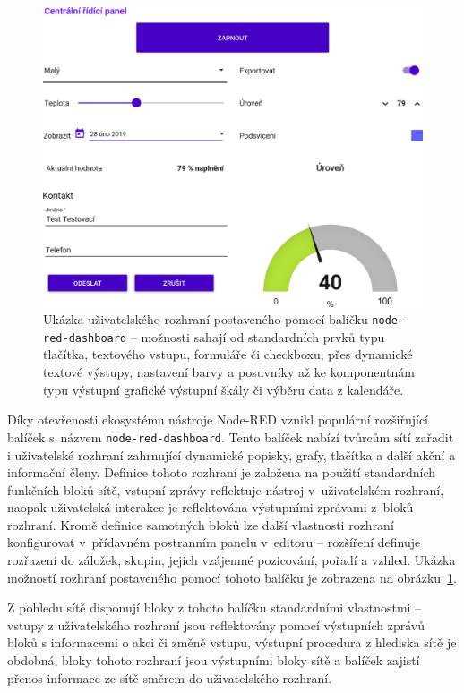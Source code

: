 \begin{figure}[th]
    \centering
    \includegraphics[width=\textwidth]{figures/node-red-dashboard.png}
    \caption{Ukázka uživatelského rozhraní postaveného pomocí balíčku \texttt{node-red-dashboard} -- možnosti sahají
    od standardních prvků typu tlačítka, textového vstupu, formuláře či checkboxu, přes dynamické textové výstupy,
    nastavení barvy a posuvníky až ke komponentnám typu výstupní grafické výstupní škály či výběru data z kalendáře.}
    \label{fig:node-red-dashboard}
\end{figure}

Díky otevřenosti ekosystému nástroje Node-RED vznikl populární rozšiřující balíček s~názvem
\texttt{node-red-dashboard}.
Tento balíček nabízí tvůrcům sítí zařadit i uživatelské rozhraní zahrnující dynamické
popisky, grafy, tlačítka a další akční a informační členy.
Definice tohoto rozhraní je založena na použití standardních funkčních bloků sítě, vstupní zprávy reflektuje nástroj
v~uživatelském rozhraní, naopak uživatelská interakce je reflektována výstupními zprávami z~bloků rozhraní.
Kromě definice samotných bloků lze další vlastnosti rozhraní konfigurovat v~přídavném postranním panelu v~editoru --
rozšíření definuje rozřazení do záložek, skupin, jejich vzájemné pozicování, pořadí a vzhled.
Ukázka možností rozhraní postaveného pomocí tohoto balíčku je zobrazena na obrázku~\ref{fig:node-red-dashboard}.

Z pohledu sítě disponují bloky z tohoto balíčku standardními vlastnostmi -- vstupy z uživatelského rozhraní jsou
reflektovány pomocí výstupních zprávů bloků s informacemi o akci či změně vstupu, výstupní procedura z hlediska sítě
je obdobná, bloky tohoto rozhraní jsou výstupními bloky sítě a balíček zajistí přenos informace ze sítě směrem do
uživatelského rozhraní.

